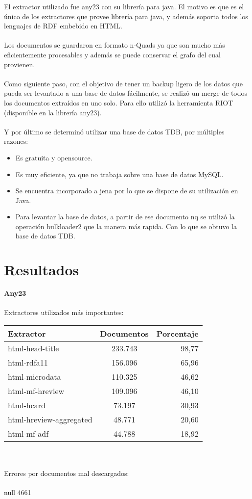 \noindent El extractor utilizado fue any23 con su librería para java. El motivo es que es el único de los extractores que provee 
librería para java, y además soporta todos los lenguajes de RDF embebido en HTML.
\\\\
Los documentos se guardaron en formato n-Quads ya que son mucho más eficientemente procesables y además se puede conservar el grafo 
del cual provienen.
\\\\
Como siguiente paso, con el objetivo de tener un backup ligero de los datos que pueda ser levantado a una base de datos fácilmente, se realizó un merge de todos los documentos extraídos en uno solo.
Para ello utilizó la herramienta RIOT (disponible en la librería any23).
\\\\
Y por último se determinó utilizar una base de datos TDB, por múltiples razones:
\begin{itemize}
\item Es gratuita y opensource. 
\item Es muy eficiente, ya que no trabaja sobre una base de datos MySQL.
\item Se encuentra incorporado a jena por lo que se dispone de su utilización en Java.
\item Para levantar la base de datos, a partir de ese documento nq se utilizó la operación bulkloader2 que la manera más rapida. Con lo que se obtuvo la base de datos TDB.
\end{itemize}

\section{Resultados}

\textbf{Any23}
\\\\
Extractores utilizados más importantes:\\
\begin{tabular}{| l | c | r | }\hline
Extractor & Documentos & Porcentaje \\\hline
html-head-title & 233.743 & 98,77 \\    
html-rdfa11 & 156.096 & 65,96 \\
html-microdata & 110.325 & 46,62 \\    
html-mf-hreview & 109.096 & 46,10 \\
html-hcard & 73.197 & 30,93  \\
html-hreview-aggregated & 48.771 & 20,60 \\
html-mf-adf & 44.788 & 18,92 \\\hline
 \end{tabular}
\\
\\
Errores por documentos mal descargados:
\\\\
null 4661


